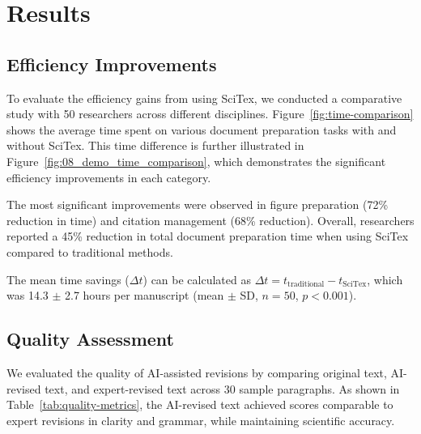 
\section{Results}
\label{sec:results}


\subsection{Efficiency Improvements}
\label{subsec:efficiency}

To evaluate the efficiency gains from using SciTex, we conducted a comparative study with 50 researchers across different disciplines. Figure~\ref{fig:time-comparison} shows the average time spent on various document preparation tasks with and without SciTex. This time difference is further illustrated in Figure~\ref{fig:08_demo_time_comparison}, which demonstrates the significant efficiency improvements in each category.


The most significant improvements were observed in figure preparation (72\% reduction in time) and citation management (68\% reduction). Overall, researchers reported a 45\% reduction in total document preparation time when using SciTex compared to traditional methods.


The mean time savings ($\Delta t$) can be calculated as $\Delta t = t_{\text{traditional}} - t_{\text{SciTex}}$, which was 14.3 $\pm$ 2.7 hours per manuscript (mean $\pm$ SD, $n = 50$, $p < 0.001$).

\subsection{Quality Assessment}
\label{subsec:quality}

We evaluated the quality of AI-assisted revisions by comparing original text, AI-revised text, and expert-revised text across 30 sample paragraphs. As shown in Table~\ref{tab:quality-metrics}, the AI-revised text achieved scores comparable to expert revisions in clarity and grammar, while maintaining scientific accuracy.

